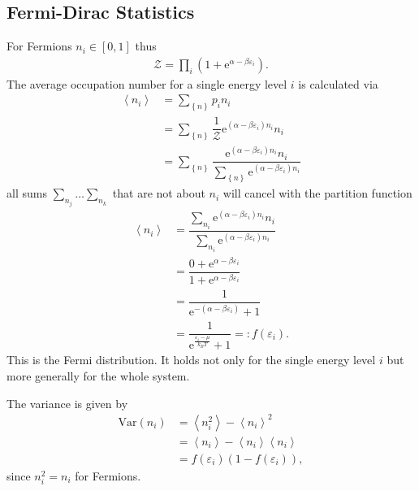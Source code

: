 \documentclass[a4paper,10pt]{article}
\numberwithin{equation}{section}
\begin{document}
\begin{multicols}{2}
\subsection{Fermi-Dirac Statistics}
For Fermions $n_i  \in \left[0,1\right]$ thus
\begin{align} 
  \mathcal{Z}=\prod_{i}^{}\left(1+\text{e}^{\alpha -\beta \varepsilon _i}\right)
.\end{align} 
The average occupation number for a single energy level $i$ is calculated via 
\begin{align} 
  \left\langle n_i\right\rangle  &= \sum_{ \left\{n\right\}}^{}p_i n_i\\
                                 &= \sum_{ \left\{n\right\}}^{}\dfrac{1}{\mathcal{Z}}\text{e}^{(\alpha -\beta \varepsilon _i)n_i}n_i\\
                                 &= \sum_{ \left\{n\right\}}^{}\dfrac{\text{e}^{(\alpha -\beta \varepsilon _i)n_i}n_i}{\sum_{ \left\{n\right\}}^{}\text{e}^{(\alpha -\beta \varepsilon _i)n_i}}
\end{align} 
all sums $\sum_{n_j}^{}\hdots \sum_{n_k}^{}$ that are not about $n_i$ will cancel with the partition function
\begin{align} 
  \left\langle n_i\right\rangle  &= \dfrac{\sum_{n_i}^{}\text{e}^{(\alpha -\beta \varepsilon _i)n_i}n_i}{\sum_{n_i}^{}\text{e}^{(\alpha -\beta \varepsilon _i)n_i}}\\
                                 &= \dfrac{0+\text{e}^{\alpha -\beta \varepsilon _i}}{1+\text{e}^{\alpha -\beta \varepsilon _i}}\\
                                 &= \dfrac{1}{\text{e}^{-(\alpha -\beta \varepsilon _i)}+1}\\
                                 &= \boxed{\dfrac{1}{\text{e}^{\tfrac{\varepsilon _i-\mu }{k_BT}}+1} =: f(\varepsilon _i)}
.\end{align} 
This is the Fermi distribution.
It holds not only for the single energy level $i$ but more generally for the whole system.

The variance is given by
\begin{align} 
  \text{Var}(n_i) &= \left\langle n_i^2\right\rangle -\left\langle n_i\right\rangle ^2\\
                  &= \left\langle n_i\right\rangle -\left\langle n_i\right\rangle \left\langle n_i\right\rangle \\
                  &= f(\varepsilon _i)(1-f(\varepsilon _i))
,\end{align} 
since $n_i^2=n_i$ for Fermions.


\end{multicols}
\end{document}
